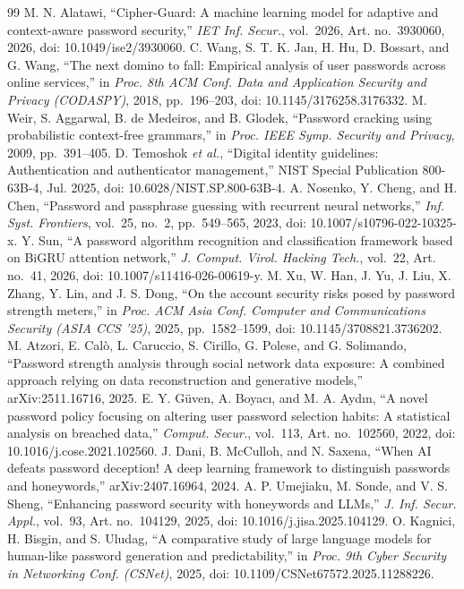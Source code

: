 \documentclass[conference]{IEEEtran}
\begin{document}
\begin{thebibliography}{99}
 M. N. Alatawi, ``Cipher-Guard: A machine learning model for adaptive and context-aware password security,'' \emph{IET Inf. Secur.}, vol.~2026, Art. no.~3930060, 2026, doi: 10.1049/ise2/3930060.
 C. Wang, S. T. K. Jan, H. Hu, D. Bossart, and G. Wang, ``The next domino to fall: Empirical analysis of user passwords across online services,'' in \emph{Proc. 8th ACM Conf. Data and Application Security and Privacy (CODASPY)}, 2018, pp.~196--203, doi: 10.1145/3176258.3176332.
 M. Weir, S. Aggarwal, B. de Medeiros, and B. Glodek, ``Password cracking using probabilistic context-free grammars,'' in \emph{Proc. IEEE Symp. Security and Privacy}, 2009, pp.~391--405.
 D. Temoshok \emph{et al.}, ``Digital identity guidelines: Authentication and authenticator management,'' NIST Special Publication 800-63B-4, Jul. 2025, doi: 10.6028/NIST.SP.800-63B-4.
 A. Nosenko, Y. Cheng, and H. Chen, ``Password and passphrase guessing with recurrent neural networks,'' \emph{Inf. Syst. Frontiers}, vol.~25, no.~2, pp.~549--565, 2023, doi: 10.1007/s10796-022-10325-x.
 Y. Sun, ``A password algorithm recognition and classification framework based on BiGRU attention network,'' \emph{J. Comput. Virol. Hacking Tech.}, vol.~22, Art. no.~41, 2026, doi: 10.1007/s11416-026-00619-y.
 M. Xu, W. Han, J. Yu, J. Liu, X. Zhang, Y. Lin, and J. S. Dong, ``On the account security risks posed by password strength meters,'' in \emph{Proc. ACM Asia Conf. Computer and Communications Security (ASIA CCS '25)}, 2025, pp.~1582--1599, doi: 10.1145/3708821.3736202.
 M. Atzori, E. Cal\`o, L. Caruccio, S. Cirillo, G. Polese, and G. Solimando, ``Password strength analysis through social network data exposure: A combined approach relying on data reconstruction and generative models,'' arXiv:2511.16716, 2025.
 E. Y. G\"uven, A. Boyac\i, and M. A. Ayd\i n, ``A novel password policy focusing on altering user password selection habits: A statistical analysis on breached data,'' \emph{Comput. Secur.}, vol.~113, Art. no.~102560, 2022, doi: 10.1016/j.cose.2021.102560.
 J. Dani, B. McCulloh, and N. Saxena, ``When AI defeats password deception! A deep learning framework to distinguish passwords and honeywords,'' arXiv:2407.16964, 2024.
 A. P. Umejiaku, M. Sonde, and V. S. Sheng, ``Enhancing password security with honeywords and LLMs,'' \emph{J. Inf. Secur. Appl.}, vol.~93, Art. no.~104129, 2025, doi: 10.1016/j.jisa.2025.104129.
 O. Kagnici, H. Bisgin, and S. Uludag, ``A comparative study of large language models for human-like password generation and predictability,'' in \emph{Proc. 9th Cyber Security in Networking Conf. (CSNet)}, 2025, doi: 10.1109/CSNet67572.2025.11288226.

\end{thebibliography}
\end{document}
